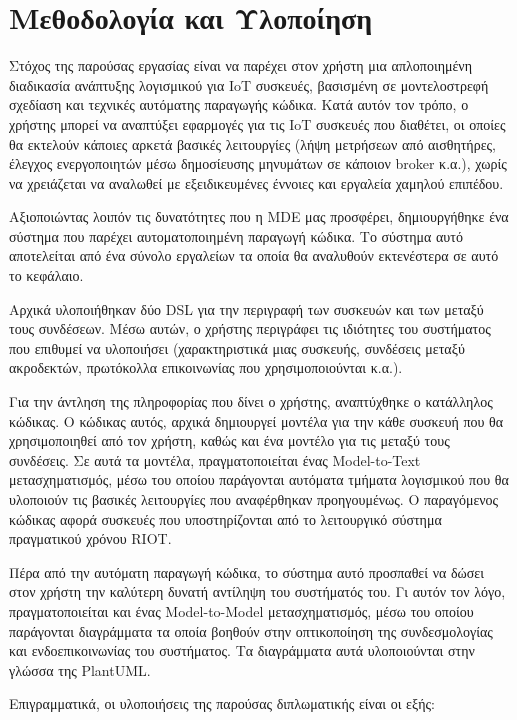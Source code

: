 \chapter{Μεθοδολογία και Υλοποίηση}
\label{chapter:implementations}

Στόχος της παρούσας εργασίας είναι να παρέχει στον χρήστη μια απλοποιημένη διαδικασία ανάπτυξης λογισμικού για IoT συσκευές, βασισμένη σε μοντελοστρεφή σχεδίαση και τεχνικές αυτόματης παραγωγής κώδικα. Κατά αυτόν τον τρόπο, ο χρήστης μπορεί να αναπτύξει εφαρμογές για τις IoT συσκευές που διαθέτει, οι οποίες θα εκτελούν κάποιες αρκετά βασικές λειτουργίες (λήψη μετρήσεων από αισθητήρες, έλεγχος ενεργοποιητών μέσω δημοσίευσης μηνυμάτων σε κάποιον broker κ.α.), χωρίς να χρειάζεται να αναλωθεί με εξειδικευμένες έννοιες και εργαλεία χαμηλού επιπέδου.

Αξιοποιώντας λοιπόν τις δυνατότητες που η MDE μας προσφέρει, δημιουργήθηκε ένα σύστημα που παρέχει αυτοματοποιημένη παραγωγή κώδικα. Το σύστημα αυτό αποτελείται από ένα σύνολο εργαλείων τα οποία θα αναλυθούν εκτενέστερα σε αυτό το κεφάλαιο.

Αρχικά υλοποιήθηκαν δύο DSL για την περιγραφή των συσκευών και των μεταξύ τους συνδέσεων. Μέσω αυτών, ο χρήστης περιγράφει τις ιδιότητες του συστήματος που επιθυμεί να υλοποιήσει (χαρακτηριστικά μιας συσκευής, συνδέσεις μεταξύ ακροδεκτών, πρωτόκολλα επικοινωνίας που χρησιμοποιούνται κ.α.).  

Για την άντληση της πληροφορίας που δίνει ο χρήστης, αναπτύχθηκε ο κατάλληλος κώδικας. Ο κώδικας αυτός, αρχικά δημιουργεί μοντέλα για την κάθε συσκευή που θα χρησιμοποιηθεί από τον χρήστη, καθώς και ένα μοντέλο για τις μεταξύ τους συνδέσεις. Σε αυτά τα μοντέλα, πραγματοποιείται ένας Model-to-Text μετασχηματισμός, μέσω του οποίου παράγονται αυτόματα τμήματα λογισμικού που θα υλοποιούν τις βασικές λειτουργίες που αναφέρθηκαν προηγουμένως. Ο παραγόμενος κώδικας αφορά συσκευές που υποστηρίζονται από το λειτουργικό σύστημα πραγματικού χρόνου RIOT. 

Πέρα από την αυτόματη παραγωγή κώδικα, το σύστημα αυτό προσπαθεί να δώσει στον χρήστη την καλύτερη δυνατή αντίληψη του συστήματός του. Γι αυτόν τον λόγο, πραγματοποιείται και ένας Model-to-Model μετασχηματισμός, μέσω του οποίου παράγονται διαγράμματα τα οποία βοηθούν στην οπτικοποίηση της συνδεσμολογίας και ενδοεπικοινωνίας του συστήματος. Τα διαγράμματα αυτά υλοποιούνται στην γλώσσα της PlantUML.

Επιγραμματικά, οι υλοποιήσεις της παρούσας διπλωματικής είναι οι εξής:


